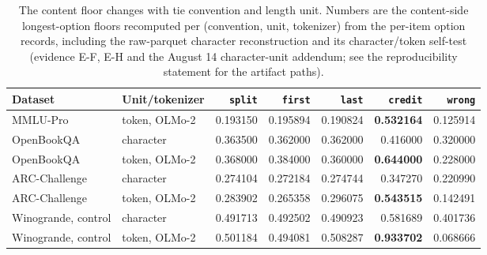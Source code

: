 \begin{table}[t]
\centering
\small
\setlength{\tabcolsep}{4.5pt}
\begin{tabular}{llrrrrr}
\toprule
Dataset & Unit/tokenizer & \texttt{split} & \texttt{first} & \texttt{last} & \texttt{credit} & \texttt{wrong} \\
\midrule
MMLU-Pro & token, OLMo-2 & 0.193150 & 0.195894 & 0.190824 & \textbf{0.532164} & 0.125914 \\
OpenBookQA & character & 0.363500 & 0.362000 & 0.362000 & 0.416000 & 0.320000 \\
OpenBookQA & token, OLMo-2 & 0.368000 & 0.384000 & 0.360000 & \textbf{0.644000} & 0.228000 \\
ARC-Challenge & character & 0.274104 & 0.272184 & 0.274744 & 0.347270 & 0.220990 \\
ARC-Challenge & token, OLMo-2 & 0.283902 & 0.265358 & 0.296075 & \textbf{0.543515} & 0.142491 \\
Winogrande, control & character & 0.491713 & 0.492502 & 0.490923 & 0.581689 & 0.401736 \\
Winogrande, control & token, OLMo-2 & 0.501184 & 0.494081 & 0.508287 & \textbf{0.933702} & 0.068666 \\
\bottomrule
\end{tabular}
\caption{The content floor changes with tie convention and length unit. Numbers are the content-side longest-option floors recomputed per (convention, unit, tokenizer) from the per-item option records, including the raw-parquet character reconstruction and its character/token self-test (evidence \textsf{E-F}, \textsf{E-H} and the August 14 character-unit addendum; see the reproducibility statement for the artifact paths).}
\label{tab:conventions}
\end{table}
